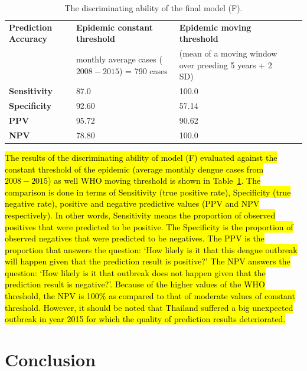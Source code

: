 \documentclass{bmcart}
\begin{document}
\begin{table}
	\centering
	\label{my-label}
	\begin{tabular}{|l|p{4.0cm}|p{4.0cm}|ll}
		\hline
		\textbf{Prediction Accuracy} & \textbf{Epidemic constant threshold}  & \textbf{Epidemic moving threshold} \\
		& monthly average cases ($2008-2015$) = 790 cases  & (mean of a moving window over preeding 5 years + 2 SD) \\  \cline{1-3}
		\textbf{Sensitivity} & 87.0  & 100.0  \\ 
		\textbf{Specificity} & 92.60 &  57.14  \\ 
		\textbf{PPV} & 95.72 &  90.62         \\ 
		\textbf{NPV} & 78.80  &  100.0        \\\cline{1-3}
	\end{tabular}
	\caption{The discriminating ability of the final model (F).} 
	\label{tab:resultsBinary}
\end{table}

\hl{The  results of the discriminating ability of model (F) evaluated against the constant threshold of the epidemic (average monthly dengue cases from $2008-2015$) as well WHO moving threshold is shown in Table~\ref{tab:resultsBinary}. The comparison is done in terms of Sensitivity (true positive rate), Specificity (true negative rate), positive and negative predictive values (PPV and NPV respectively).  In other words, Sensitivity means the proportion of observed positives that were predicted to be positive. The Specificity is the proportion of observed negatives that were predicted to be negatives. The PPV is the proportion that answers the question: `How likely is it that this dengue outbreak will happen given that the prediction result is positive?' The NPV answers the question: `How likely is it that outbreak does not happen given that the prediction result is negative?'. Because of the higher values of the WHO threshold, the NPV is 100\% as compared to that of moderate values of constant threshold. However, it should be noted that Thailand suffered a big unexpected outbreak in year 2015 for which the quality of prediction results deteriorated.}




\section{Conclusion} \label{discussion}
\end{document}
